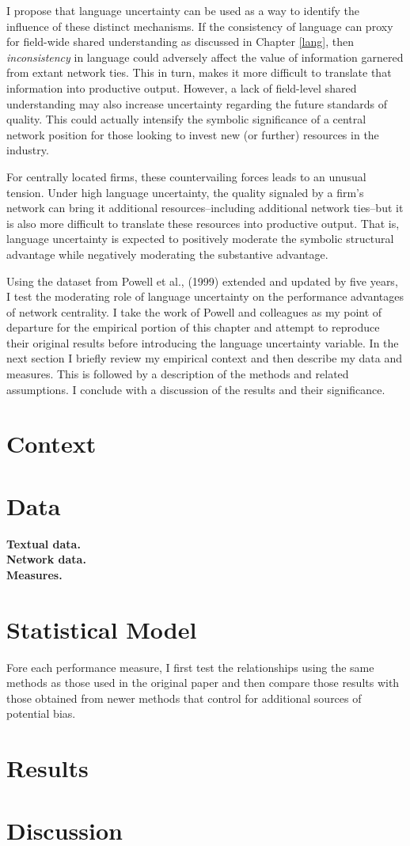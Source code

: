 I propose that language uncertainty can be used as a way to identify the influence of these distinct mechanisms. If the consistency of language can proxy for field-wide shared understanding as discussed in Chapter \ref{lang}, then \emph{inconsistency} in language could adversely affect the value of information garnered from extant network ties. This in turn, makes it more difficult to translate that information into productive output. However, a lack of field-level shared understanding may also increase uncertainty regarding the future standards of quality. This could actually intensify the symbolic significance of a central network position for those looking to invest new (or further) resources in the industry. 

For centrally located firms, these countervailing forces leads to an unusual tension. Under high language uncertainty, the quality signaled by a firm's network can bring it additional resources--including additional network ties--but it is also more difficult to translate these resources into productive output. That is, language uncertainty is expected to positively moderate the symbolic  structural advantage while negatively moderating the substantive advantage.

Using the dataset from Powell et al., (1999) extended and updated by five years, I test the moderating role of language uncertainty on the performance advantages of network centrality. I take the work of Powell and colleagues as my point of departure for the empirical portion of this chapter and attempt to reproduce their original results before introducing the language uncertainty variable. In the next section I briefly review my empirical context and then describe my data and measures. This is followed by a description of the methods and related assumptions. I conclude with a discussion of the results and their significance.

\section{Context}
\section{Data}
\textbf{Textual data.}\\
\textbf{Network data.}\\
\textbf{Measures.}\\
\section{Statistical Model}

Fore each performance measure, I first test the relationships using the same methods as those used in the original paper and then compare those results with those obtained from newer methods that control for additional sources of potential bias.

\section{Results}
\section{Discussion}